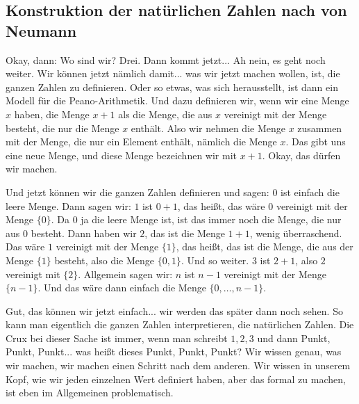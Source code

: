 \subsection{Konstruktion der natürlichen Zahlen nach von Neumann}
\begin{spoken-clean}[continued]
Okay, dann: Wo sind wir? Drei. Dann kommt jetzt... Ah nein, es geht noch weiter. Wir können jetzt nämlich damit... was wir jetzt machen wollen, ist, die ganzen Zahlen zu definieren. Oder so etwas, was sich herausstellt, ist dann ein Modell für die Peano-Arithmetik. Und dazu definieren wir, wenn wir eine Menge $x$ haben, die Menge $x + 1$ als die Menge, die aus $x$ vereinigt mit der Menge besteht, die nur die Menge $x$ enthält. Also wir nehmen die Menge $x$ zusammen mit der Menge, die nur ein Element enthält, nämlich die Menge $x$. Das gibt uns eine neue Menge, und diese Menge bezeichnen wir mit $x + 1$. Okay, das dürfen wir machen.

Und jetzt können wir die ganzen Zahlen definieren und sagen: $0$ ist einfach die leere Menge. Dann sagen wir: $1$ ist $0 + 1$, das heißt, das wäre $0$ vereinigt mit der Menge $\{0\}$. Da $0$ ja die leere Menge ist, ist das immer noch die Menge, die nur aus $0$ besteht. Dann haben wir $2$, das ist die Menge $1 + 1$, wenig überraschend. Das wäre $1$ vereinigt mit der Menge $\{1\}$, das heißt, das ist die Menge, die aus der Menge $\{1\}$ besteht, also die Menge $\{0, 1\}$. Und so weiter. $3$ ist $2 + 1$, also $2$ vereinigt mit $\{2\}$. Allgemein sagen wir: $n$ ist $n-1$ vereinigt mit der Menge $\{n-1\}$. Und das wäre dann einfach die Menge $\{0, \dots, n-1\}$.

Gut, das können wir jetzt einfach... wir werden das später dann noch sehen. So kann man eigentlich die ganzen Zahlen interpretieren, die natürlichen Zahlen. Die Crux bei dieser Sache ist immer, wenn man schreibt $1, 2, 3$ und dann Punkt, Punkt, Punkt... was heißt dieses Punkt, Punkt, Punkt? Wir wissen genau, was wir machen, wir machen einen Schritt nach dem anderen. Wir wissen in unserem Kopf, wie wir jeden einzelnen Wert definiert haben, aber das formal zu machen, ist eben im Allgemeinen problematisch.
\end{spoken-clean}

